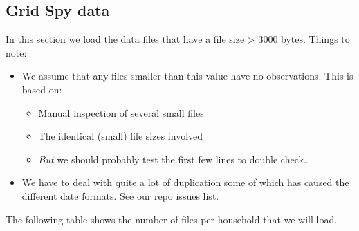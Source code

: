 \documentclass[]{article}
\newenvironment{Shaded}{\begin{snugshade}}{\end{snugshade}}
\newcommand{\KeywordTok}[1]{\textcolor[rgb]{0.13,0.29,0.53}{\textbf{#1}}}
\newcommand{\DataTypeTok}[1]{\textcolor[rgb]{0.13,0.29,0.53}{#1}}
\newcommand{\StringTok}[1]{\textcolor[rgb]{0.31,0.60,0.02}{#1}}
\newcommand{\CommentTok}[1]{\textcolor[rgb]{0.56,0.35,0.01}{\textit{#1}}}
\newcommand{\OperatorTok}[1]{\textcolor[rgb]{0.81,0.36,0.00}{\textbf{#1}}}
\newcommand{\NormalTok}[1]{#1}
\providecommand{\tightlist}{%
  \setlength{\itemsep}{0pt}\setlength{\parskip}{0pt}}
\begin{document}
\subsection{Grid Spy data}\label{grid-spy-data}

In this section we load the data files that have a file size
\textgreater{} 3000 bytes. Things to note:

\begin{itemize}
\tightlist
\item
  We assume that any files smaller than this value have no observations.
  This is based on:

  \begin{itemize}
  \tightlist
  \item
    Manual inspection of several small files
  \item
    The identical (small) file sizes involved
  \item
    \emph{But} we should probably test the first few lines to double
    check\ldots{}
  \end{itemize}
\item
  We have to deal with quite a lot of duplication some of which has
  caused the different date formats. See our
  \href{https://git.soton.ac.uk/ba1e12/nzGREENGrid/issues?scope=all\&utf8=\%E2\%9C\%93\&state=all}{repo
  issues list}.
\end{itemize}

The following table shows the number of files per household that we will
load.

\begin{Shaded}
\end{Shaded}
\end{document}
